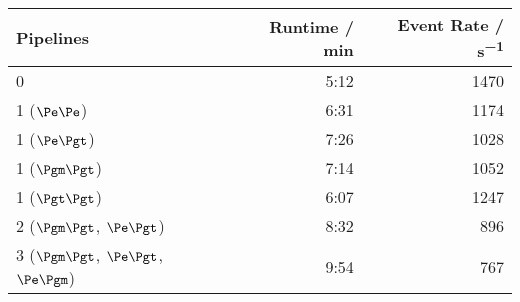 \documentclass[3p]{elsarticle}
\begin{document}
\begin{table}[h!]
\centering
\begin{tabular}{lrr}
\toprule
\textbf{Pipelines}                                & \textbf{Runtime / \si{min}} & \textbf{Event Rate / \si{s^{-1}} } \\ \midrule
 0                                                & 5:12                             & 1470 \\ \midrule
 1 ($\Pe\Pe$)                                     & 6:31                             & 1174 \\
 1 ($\Pe\Pgt$)                                    & 7:26                             & 1028 \\
 1 ($\Pgm\Pgt$)                                   & 7:14                             & 1052 \\
 1 ($\Pgt\Pgt$)                                   & 6:07                             & 1247 \\ \midrule
 2 ($\Pgm\Pgt$, $\Pe\Pgt$)                        & 8:32                             & 896 \\
 3 ($\Pgm\Pgt$, $\Pe\Pgt$, $\Pe\Pgm$)             & 9:54                             & 767 \\

\end{tabular}
\end{table}
\end{document}
